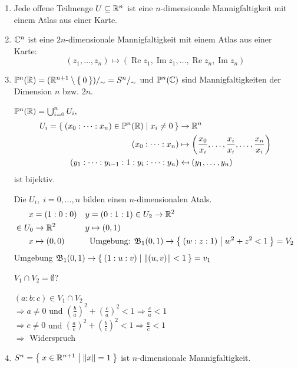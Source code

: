 \begin{beispiel}
    \begin{enumerate}[label=\arabic*)]
        \item Jede offene Teilmenge $U \subseteq \mathbb{R}^n$ ist eine 
              $n$-dimensionale Mannigfaltigkeit mit einem Atlas aus 
              einer Karte.
        \item $\mathbb{C}^n$ ist eine $2n$-dimensionale Mannigfaltigkeit
              mit einem Atlas aus einer Karte:
              \[(z_1, \dots, z_n) \mapsto (\operatorname{Re} z_1, \operatorname{Im}z_1, \dots, \operatorname{Re}z_n, \operatorname{Im}z_n)\]
        \item $\mathbb{P}^n(\mathbb{R}) = (\mathbb{R}^{n+1} \setminus \Set{0})/_\sim = S^n /_\sim$ und $\mathbb{P}^n(\mathbb{C})$ sind Mannigfaltigkeiten 
              der Dimension $n$ bzw. $2n$.

              $\mathbb{P}^n(\mathbb{R}) = \bigcup_{i=0}^n U_i,$
              \begin{align*}
U_i = \Set{(x_0: \dots : x_n) \in \mdp^n(\mdr) | x_i \neq 0} &\rightarrow \mdr^n\\
                (x_0 : \dots : x_n) &\mapsto \left (\frac{x_0}{x_i}, \dots, \frac{x_i}{x_i}, \dots, \frac{x_n}{x_i} \right )\\
                (y_1 : \dots : y_{i-1} : 1 : y_i : \dots : y_n) &\mapsfrom (y_1, \dots, y_n)
              \end{align*}
              ist bijektiv.

              Die $U_i,\; i = 0, \dots, n$ bilden einen $n$-dimensionalen Atals.
              \begin{align*}
                      x &= (1:0:0)            &y &= (0:1:1) \in U_2 \rightarrow \mathbb{R}^2\\
                \in U_0 &\rightarrow \mathbb{R}^2   &y &\mapsto (0,1)\\
                      x &\mapsto (0,0)        &&\text{Umgebung: } \mathfrak{B}_1 (0,1) \rightarrow \Set{(w:z:1) | w^2 + z^2 < 1} = V_2
              \end{align*}
              Umgebung $\mathfrak{B}_1(0,1) \rightarrow \Set{(1:u:v) | \|(u,v)\| < 1} = v_1$

              $V_1 \cap V_2 = \emptyset$?

              $(a:b:c) \in V_1 \cap V_2$\\
              $\Rightarrow a \neq 0$ und $(\frac{b}{a})^2 + (\frac{c}{a})^2 < 1 \Rightarrow \frac{c}{a} < 1$\\
              $\Rightarrow c \neq 0$ und $(\frac{a}{c})^2 + (\frac{b}{c})^2 < 1 \Rightarrow \frac{a}{c} < 1$\\
              $\Rightarrow$ Widerspruch
        \item $S^n = \Set{x \in \ensuremath{\mathbb{R}}^{n+1} | \|x\| = 1}$ ist $n$-dimensionale
              Mannigfaltigkeit.


\end{enumerate}
\end{beispiel}
